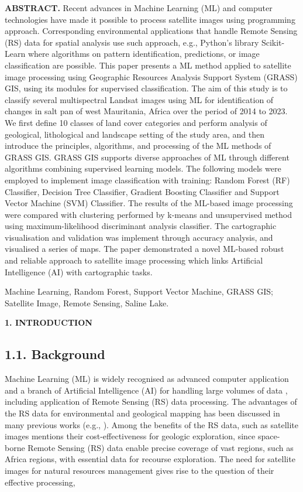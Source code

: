 \documentclass[12pt,a4paper,oneside]{article}
\def \newsection{\vspace{12pt}\textbf}
\def \newpar{\vspace{6pt}}
\begin{document}
{\bf ABSTRACT.} Recent advances in Machine Learning (ML) and computer technologies have made it possible to process satellite images using programming approach. Corresponding environmental applications that handle Remote Sensing (RS) data for spatial analysis use such approach, e.g., Python's library Scikit-Learn where algorithms on pattern identification, predictions, or image classification are possible. This paper presents a ML method applied to satellite image processing using Geographic Resources Analysis Support System (GRASS) GIS, using its modules for supervised classification. The aim of this study is to classify several multispectral Landsat images using ML for identification of changes in salt pan of west Mauritania, Africa over the period of 2014 to 2023. We first define 10 classes of land cover categories and perform analysis of geological, lithological and landscape setting of the study area, and then introduce the principles, algorithms, and processing of the ML methods of GRASS GIS. GRASS GIS supports diverse approaches of ML through different algorithms combining supervised learning models. The following models were employed to implement image classification with training: Random Forest (RF) Classifier, Decision Tree Classifier, Gradient Boosting Classifier and Support Vector Machine (SVM) Classifier. The results of the ML-based image processing were compared with clustering performed by k-means and unsupervised method using maximum-likelihood discriminant analysis classifier. The cartographic visualisation and validation was implement through accuracy analysis, and visualised a series of maps. The paper demonstrated a novel ML-based robust and reliable approach to satellite image processing which links Artificial Intelligence (AI) with cartographic tasks.

\newpar {\bf Keywords:} Machine Learning, Random Forest, Support Vector Machine, GRASS GIS; Satellite Image, Remote Sensing, Saline Lake.

\newsection {1. INTRODUCTION}

\subsection*{1.1. Background}

\newpar Machine Learning (ML) is widely recognised as advanced computer application and a branch of Artificial Intelligence (AI) for handling large volumes of data \citep{YANG2024102087,RATHORE2016122,CEDRIC2022100049}, including application of Remote Sensing (RS) data processing. The advantages of the RS data for environmental and geological mapping has been discussed in many previous works (e.g., \citep{Parajuli,Niang2022,Lemenkova202321,Ashpole}). Among the benefits of the RS data, such as satellite images \citep{GRANDJEAN2006220} mentions their cost-effectiveness for geologic exploration, since space-borne Remote Sensing (RS) data enable precise coverage of vast regions, such as Africa regions, with essential data for recourse exploration. The need for satellite images for natural resources management gives rise to the question of their effective processing,
\end{document}
